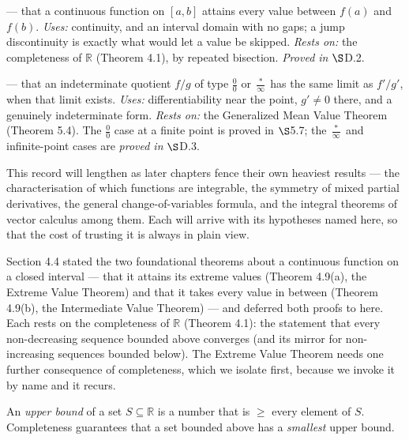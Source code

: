 \documentclass[a4paper,12pt,oneside]{memoir}
\begin{document}
 — that a continuous function on \([a, b]\) attains every value between \(f(a)\) and \(f(b)\). \emph{Uses:} continuity, and an interval domain with no gaps; a jump discontinuity is exactly what would let a value be skipped. \emph{Rests on:} the completeness of \(\mathbb{R}\) (Theorem 4.1), by repeated bisection. \emph{Proved in} \(\S\)D.2.

 — that an indeterminate quotient \(f/g\) of type \(\tfrac{0}{0}\) or \(\tfrac{\ast}{\infty}\) has the same limit as \(f'/g'\), when that limit exists. \emph{Uses:} differentiability near the point, \(g' \ne 0\) there, and a genuinely indeterminate form. \emph{Rests on:} the Generalized Mean Value Theorem (Theorem 5.4). The \(\tfrac{0}{0}\) case at a finite point is proved in \(\S\)5.7; the \(\tfrac{\ast}{\infty}\) and infinite-point cases are \emph{proved in} \(\S\)D.3.

This record will lengthen as later chapters fence their own heaviest results — the characterisation of which functions are integrable, the symmetry of mixed partial derivatives, the general change-of-variables formula, and the integral theorems of vector calculus among them. Each will arrive with its hypotheses named here, so that the cost of trusting it is always in plain view.


Section 4.4 stated the two foundational theorems about a continuous function on a closed interval — that it attains its extreme values (Theorem 4.9(a), the Extreme Value Theorem) and that it takes every value in between (Theorem 4.9(b), the Intermediate Value Theorem) — and deferred both proofs to here. Each rests on the completeness of \(\mathbb{R}\) (Theorem 4.1): the statement that every non-decreasing sequence bounded above converges (and its mirror for non-increasing sequences bounded below). The Extreme Value Theorem needs one further consequence of completeness, which we isolate first, because we invoke it by name and it recurs.

An \emph{upper bound} of a set \(S \subseteq \mathbb{R}\) is a number that is \(\ge\) every element of \(S\). Completeness guarantees that a set bounded above has a \emph{smallest} upper bound.
\end{document}

